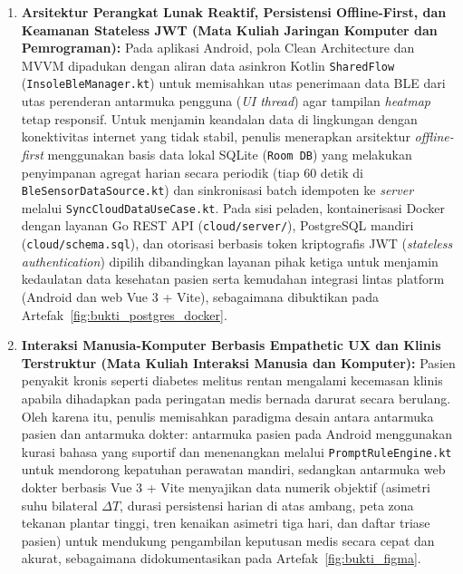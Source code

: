 \begin{enumerate}
    \item \textbf{Arsitektur Perangkat Lunak Reaktif, Persistensi Offline-First, dan Keamanan Stateless JWT (Mata Kuliah Jaringan Komputer dan Pemrograman):}
    Pada aplikasi Android, pola Clean Architecture dan MVVM dipadukan dengan aliran data asinkron Kotlin \texttt{SharedFlow} (\texttt{InsoleBleManager.kt}) untuk memisahkan utas penerimaan data BLE dari utas perenderan antarmuka pengguna (\textit{UI thread}) agar tampilan \textit{heatmap} tetap responsif. Untuk menjamin keandalan data di lingkungan dengan konektivitas internet yang tidak stabil, penulis menerapkan arsitektur \textit{offline-first} menggunakan basis data lokal SQLite (\texttt{Room DB}) yang melakukan penyimpanan agregat harian secara periodik (tiap 60 detik di \texttt{BleSensorDataSource.kt}) dan sinkronisasi batch idempoten ke \textit{server} melalui \texttt{SyncCloudDataUseCase.kt}. Pada sisi peladen, kontainerisasi Docker dengan layanan Go REST API (\texttt{cloud/server/}), PostgreSQL mandiri (\texttt{cloud/schema.sql}), dan otorisasi berbasis token kriptografis JWT (\textit{stateless authentication}) dipilih dibandingkan layanan pihak ketiga untuk menjamin kedaulatan data kesehatan pasien serta kemudahan integrasi lintas platform (Android dan web Vue 3 + Vite), sebagaimana dibuktikan pada Artefak~\ref{fig:bukti_postgres_docker}.

    \item \textbf{Interaksi Manusia-Komputer Berbasis Empathetic UX dan Klinis Terstruktur (Mata Kuliah Interaksi Manusia dan Komputer):}
    Pasien penyakit kronis seperti diabetes melitus rentan mengalami kecemasan klinis apabila dihadapkan pada peringatan medis bernada darurat secara berulang. Oleh karena itu, penulis memisahkan paradigma desain antara antarmuka pasien dan antarmuka dokter: antarmuka pasien pada Android menggunakan kurasi bahasa yang suportif dan menenangkan melalui \texttt{PromptRuleEngine.kt} untuk mendorong kepatuhan perawatan mandiri, sedangkan antarmuka web dokter berbasis Vue 3 + Vite menyajikan data numerik objektif (asimetri suhu bilateral $\Delta T$, durasi persistensi harian di atas ambang, peta zona tekanan plantar tinggi, tren kenaikan asimetri tiga hari, dan daftar triase pasien) untuk mendukung pengambilan keputusan medis secara cepat dan akurat, sebagaimana didokumentasikan pada Artefak~\ref{fig:bukti_figma}.
\end{enumerate}
